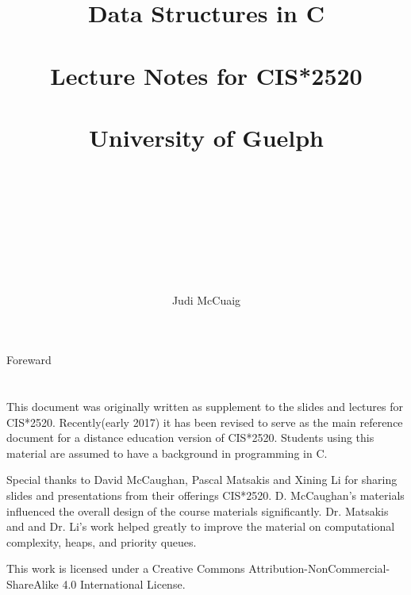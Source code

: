 \documentclass{book}
\begin{document}
\title{{ ~\\~\\~\\~\\~\\ Data Structures in C \\\Large ~\\Lecture Notes for  CIS*2520 \\~\\University of Guelph\\~\\~\\~\\~\\}}
\author{Judi McCuaig }
\maketitle

\Huge 
Foreward
\\ \\ \\
\normalsize
This document was originally written as supplement to the slides and lectures for CIS*2520.  Recently(early 2017) it has been revised to serve as the main reference document for a distance education version of CIS*2520.   Students using this material are assumed to have  a background in programming in C.   

Special thanks to David McCaughan, Pascal Matsakis and Xining Li for sharing  slides and presentations from their offerings CIS*2520.  D. McCaughan's materials influenced the overall design of the course materials significantly.   Dr. Matsakis and and Dr. Li's work helped greatly to  improve the material on computational complexity,  heaps, and priority queues.


This work is licensed under a Creative Commons Attribution-NonCommercial-ShareAlike 4.0 International License.


\tableofcontents


\mainmatter




%







%
%

%

%
\end{document}

